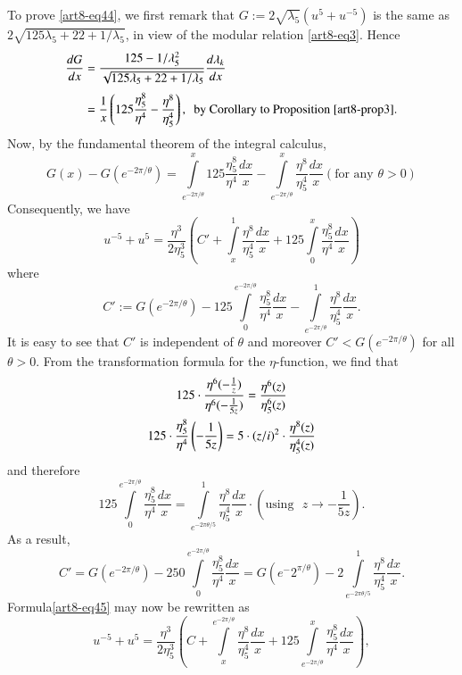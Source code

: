To prove \eqref{art8-eq44}, we first remark that $G:=2\sqrt{\lambda_{5}}(u^{5}+u^{-5})$ is the same as $2\sqrt{125\lambda_{5}+22+1/\lambda_{5}}$, in view of the modular relation \eqref{art8-eq3}. Hence
\begin{align*}
\dfrac{dG}{dx} &= \frac{125-1/\lambda^{2}_{5}}{\sqrt{125\lambda_{5}+22+1/\lambda_{5}}}\dfrac{d\lambda_{k}}{dx}\\[3pt]
               &= \frac{1}{x}\left(125\frac{\eta^{8}_{5}}{\eta^{4}}-\dfrac{\eta^{8}}{\eta^{4}_{5}}\right),\text{~ by Corollary to Proposition \ref{art8-prop3}.}
\end{align*}
Now, by the fundamental theorem of the integral calculus,
$$
G(x)-G(e^{-2\pi/\theta})=\int\limits^{x}_{e^{-2\pi/\theta}}125\frac{\eta^{8}_{5}}{\eta^{4}}\dfrac{dx}{x}-\int\limits^{x}_{e^{-2\pi/\theta}}\dfrac{\eta^{8}}{\eta^{4}_{5}}\dfrac{dx}{x}(\text{for any } \theta>0)
$$
Consequently, we have
\begin{equation}
u^{-5}+u^{5}=\dfrac{\eta^{3}}{2\eta^{3}_{5}}\left(C'+\int\limits^{1}_{x}\frac{\eta^{8}}{\eta^{4}_{5}}\dfrac{dx}{x}+125\int\limits^{x}_{0}\dfrac{\eta^{8}_{5}}{\eta^{4}}\dfrac{dx}{x}\right)\label{art8-eq45}
\end{equation}
where 
$$
C':=G(e^{-2\pi/\theta})-125\int\limits^{e^{-2\pi /\theta}}_{0}\frac{\eta^{8}_{5}}{\eta^{4}}\dfrac{dx}{x}-\int\limits^{1}_{e^{-2\pi/\theta}}\dfrac{\eta^{8}}{\eta^{4}_{5}}\dfrac{dx}{x}.
$$
It is easy to see that $C'$ is independent of $\theta$ and moreover $C'<G(e^{-2\pi/\theta})$ for all $\theta>0$. From the transformation formula for the $\eta$-function, we find that
\begin{gather}
125\cdot \frac{\eta^{6}(-\frac{1}{z})}{\eta^{6}(-\frac{1}{5z})}=\dfrac{\eta^{6}(z)}{\eta^{6}_{5}(z)}\label{art8-eq46}\\
125\cdot \dfrac{\eta^{8}_{5}}{\eta^{4}}\left(-\dfrac{1}{5z}\right)=5\cdot (z/i)^{2}\cdot \dfrac{\eta^{8}(z)}{\eta^{4}_{5}(z)}\notag
\end{gather}
and therefore
$$
125 \int\limits^{e^{-2\pi /\theta}}_{0}\dfrac{\eta^{8}_{5}}{\eta^{4}}\dfrac{dx}{x}=\int\limits^{1}_{e^{-2\pi \theta/5}}\dfrac{\eta^{8}}{\eta^{4}_{5}}\dfrac{dx}{x}\cdot \left(\text{using~ } z\to -\dfrac{1}{5z}\right).
$$
As a result,
$$
C'=G(e^{-2\pi/\theta})-250\int\limits^{e^{-2\pi/\theta}}_{0}\dfrac{\eta^{8}_{5}}{\eta^{4}}\dfrac{dx}{x}=G(e^{-}2^{\pi/\theta})-2\int\limits^{1}_{e^{-2\pi \theta/5}}\dfrac{\eta^{8}}{\eta^{4}_{5}}\dfrac{dx}{x}.
$$
Formula\pageoriginale \eqref{art8-eq45} may now be rewritten as
$$
u^{-5}+u^{5}=\dfrac{\eta^{3}}{2\eta^{3}_{5}}\left(C+\int\limits^{e^{-2\pi /\theta}}_{x}\dfrac{\eta^{8}}{\eta^{4}_{5}}\dfrac{dx}{x}+125\int\limits^{x}_{e^{-2\pi/\theta}}\dfrac{\eta^{8}_{5}}{\eta^{4}}\dfrac{dx}{x}\right),
$$
